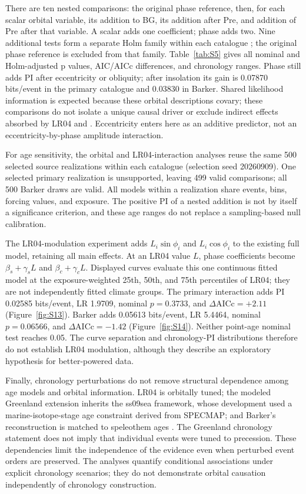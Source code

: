 \documentclass[11pt]{article}
\begin{document}
There are ten nested comparisons: the original phase reference, then, for each scalar orbital variable, its addition to BG, its addition after Pre, and addition of Pre after that variable. A scalar adds one coefficient; phase adds two. Nine additional tests form a separate Holm family within each catalogue \citep{holm1979simple}; the original phase reference is excluded from that family. Table~\ref{tab:S5} gives all nominal and Holm-adjusted p values, AIC/AICc differences, and chronology ranges. Phase still adds PI after eccentricity or obliquity; after insolation its gain is 0.07870 bits/event in the primary catalogue and 0.03830 in Barker. Shared likelihood information is expected because these orbital descriptions covary; these comparisons do not isolate a unique causal driver or exclude indirect effects absorbed by LR04 and . Eccentricity enters here as an additive predictor, not an eccentricity-by-phase amplitude interaction.

For age sensitivity, the orbital and LR04-interaction analyses reuse the same 500 selected source realizations within each catalogue (selection seed 20260909). One selected primary realization is unsupported, leaving 499 valid comparisons; all 500 Barker draws are valid. All models within a realization share events, bins, forcing values, and exposure. The positive PI of a nested addition is not by itself a significance criterion, and these age ranges do not replace a sampling-based null calibration.

The LR04-modulation experiment adds $L_i\sin\phi_i$ and $L_i\cos\phi_i$ to the existing full model, retaining all main effects. At an LR04 value $L$, phase coefficients become $\beta_s+\gamma_s L$ and $\beta_c+\gamma_c L$. Displayed curves evaluate this one continuous fitted model at the exposure-weighted 25th, 50th, and 75th percentiles of LR04; they are not independently fitted climate groups. The primary interaction adds PI 0.02585 bits/event, LR 1.9709, nominal $p=0.3733$, and $\Delta\mathrm{AICc}=+2.11$ (Figure~\ref{fig:S13}). Barker adds 0.05613 bits/event, LR 5.4464, nominal $p=0.06566$, and $\Delta\mathrm{AICc}=-1.42$ (Figure~\ref{fig:S14}). Neither point-age nominal test reaches 0.05. The curve separation and chronology-PI distributions therefore do not establish LR04 modulation, although they describe an exploratory hypothesis for better-powered data.

Finally, chronology perturbations do not remove structural dependence among age models and orbital information. LR04 is orbitally tuned; the modeled Greenland extension inherits the ss09sea framework, whose development used a marine-isotope-stage age constraint derived from SPECMAP; and Barker's reconstruction is matched to speleothem ages \citep{lisiecki2005pliocene,wolff2010millennial,southon2004radiocarbon,barker2011800}. The Greenland chronology statement does not imply that individual events were tuned to precession. These dependencies limit the independence of the evidence even when perturbed event orders are preserved. The analyses quantify conditional associations under explicit chronology scenarios; they do not demonstrate orbital causation independently of chronology construction.
\end{document}
